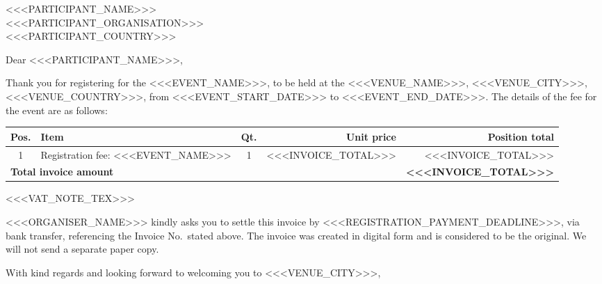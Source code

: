 \documentclass[letterhead,enlargefirstpage=true]{scrlttr2}
\begin{document}




\begin{letter}{<<<PARTICIPANT_NAME>>>\\
<<<PARTICIPANT_ORGANISATION>>>\\
<<<PARTICIPANT_COUNTRY>>>}

\opening{Dear <<<PARTICIPANT_NAME>>>,}

Thank you for registering for the <<<EVENT_NAME>>>, to be held at the <<<VENUE_NAME>>>, <<<VENUE_CITY>>>, <<<VENUE_COUNTRY>>>, from <<<EVENT_START_DATE>>> to <<<EVENT_END_DATE>>>. The details of the fee for the event are as follows:

\begin{tabular}{c p{54mm} c r r}
\bfseries Pos. & \bfseries Item & \bfseries Qt. & \bfseries Unit price & \bfseries Position total \\ \hline
1 & Registration fee: <<<EVENT_NAME>>> & 1 & <<<INVOICE_TOTAL>>> & <<<INVOICE_TOTAL>>> \\ \hline
\multicolumn{4}{l}{\bfseries Total invoice amount} & \bfseries <<<INVOICE_TOTAL>>> \\
\end{tabular}

<<<VAT_NOTE_TEX>>>

<<<ORGANISER_NAME>>> kindly asks you to settle this invoice by <<<REGISTRATION_PAYMENT_DEADLINE>>>, via bank transfer, referencing the Invoice No.\ stated above. The invoice was created in digital form and is considered to be the original. We will not send a separate paper copy.

\closing{With kind regards and looking forward to welcoming you to <<<VENUE_CITY>>>,}

\end{letter}
\end{document}
